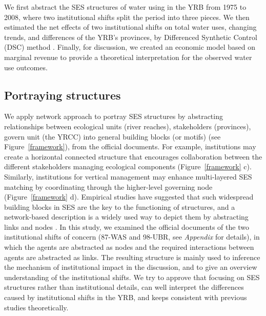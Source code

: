 
We first abstract the SES structures of water using in the YRB from 1975 to 2008, where two institutional shifts split the period into three pieces. We then estimated the net effects of two institutional shifts on total water uses, changing trends, and differences of the YRB's provinces, by Differenced Synthetic Control (DSC) method \cite{arkhangelsky2021}. Finally, for discussion, we created an economic model based on marginal revenue to provide a theoretical interpretation for the observed water use outcomes.

\subsection{Portraying structures}
We apply network approach to portray SES structures by abstracting relationships between ecological units (river reaches), stakeholders (provinces), govern unit (the YRCC) into general building blocks (or motifs) (see Figure~\ref{framework}), from the official documents.
For example, institutions may create a horizontal connected structure that encourages collaboration between the different stakeholders managing ecological components (Figure~\ref{framework} c).
Similarly, institutions for vertical management may enhance multi-layered SES matching by coordinating through the higher-level governing node (Figure~\ref{framework} d).
Empirical studies have suggested that such widespread building blocks in SES are the key to the functioning of structures, and a network-based description is a widely used way to depict them by abstracting links and nodes \cite{bodin2017a,kluger2020,guerrero2015}.
In this study, we examined the official documents of the two institutional shifts of concern (87-WAS and 98-UBR, see \textit{Appendix } for details), in which the agents are abstracted as nodes and the required interactions between agents are abstracted as links.
The resulting structure is mainly used to inference the mechanism of institutional impact in the discussion, and to give an overview understanding of the institutional shifts.
We try to approve that focusing on SES structures rather than institutional details, can well interpret the differences caused by institutional shifts in the YRB, and keeps consistent with previous studies theoretically.

